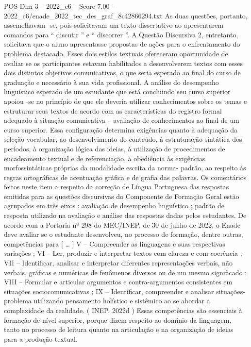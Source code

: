\begin{textsample}{POS Dim 3 – 2022\_c6 – Score 7.00 – 2022\_c6/enade\_2022\_tec\_des\_graf\_8c42866294.txt}
As duas questões, portanto, assemelhavam -se, pois solicitavam um texto dissertativo ao apresentarem comandos para “ discutir ” e “ discorrer ”.
A Questão Discursiva 2, entretanto, solicitava que o aluno apresentasse propostas de ações para o enfrentamento do problema destacado.
Esses dois estilos textuais ofereceram oportunidade de avaliar se os participantes estavam habilitados a desenvolverem textos com esses dois distintos objetivos comunicativos, o que seria esperado ao final do curso de graduação e necessário à sua vida profissional.
A análise do desempenho linguístico esperado de um estudante que está concluindo seu curso superior apoiou -se no princípio de que ele deveria utilizar conhecimentos sobre os temas e estruturar seus textos de acordo com as características do registro formal adequado à situação comunicativa – avaliação de conhecimentos ao final de um curso superior.
Essa configuração determina exigências quanto à adequação da seleção vocabular, ao desenvolvimento do conteúdo, à estruturação sintática dos períodos, à organização lógica das ideias, à utilização de procedimentos de encadeamento textual e de referenciação, à obediência às exigências morfossintáticas próprias da modalidade escrita da norma- padrão, ao respeito às regras ortográficas de acentuação gráfica e de grafia das palavras.
Os comentários feitos neste item a respeito da correção de Língua Portuguesa das respostas emitidas para as questões discursivas do Componente de Formação Geral estão agrupados em três eixos : avaliação de desempenho linguístico ; padrão de resposta utilizado na avaliação e análise das respostas dadas pelos estudantes.
De acordo com a Portaria nº 298 do MEC/INEP, de 30 de junho de 2022, o Enade deve avaliar se o estudante desenvolveu, no processo de formação, dentre outras, competências para [ … ] V – Compreender as linguagens e suas respectivas variações ; VI – Ler, produzir e interpretar textos com clareza e com coerência ; VII – Identificar, analisar e interpretar diferentes representações verbais, não verbais, gráficas e numéricas de fenômenos diversos ou de um mesmo significado ; VIII – Formular e articular argumentos e contra-argumentos consistentes em situações sociocomunicativas ; IX – Identificar, compreender e analisar situações-problema utilizando pensamento holístico e sistêmico ao se abordar a complexidade da realidade. ( INEP, 2022d ) Essas competências são essenciais à formação de nível superior, porque dizem respeito ao domínio da linguagem, tanto no processo de leitura quanto na articulação e na organização de ideias para a produção textual.

\end{textsample}
